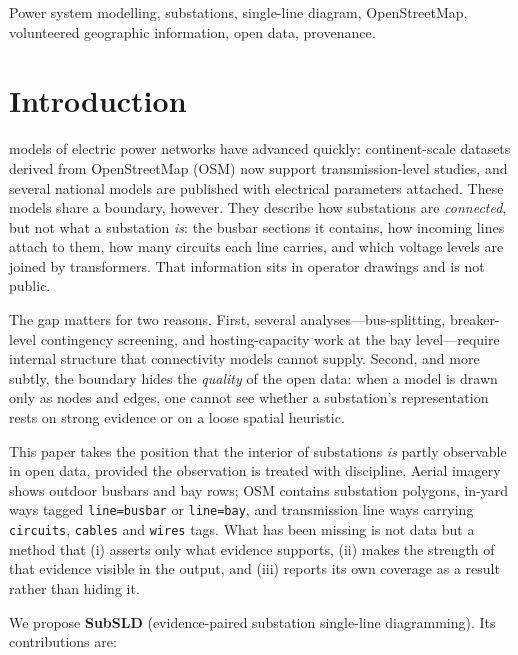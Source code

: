 \documentclass[journal]{IEEEtran}
\begin{document}
\begin{IEEEkeywords}
Power system modelling, substations, single-line diagram, OpenStreetMap,
volunteered geographic information, open data, provenance.
\end{IEEEkeywords}

\section{Introduction}

 models of electric power networks have advanced quickly:
continent-scale datasets derived from OpenStreetMap (OSM) now support
transmission-level studies, and several national models are published with
electrical parameters attached. These models share a boundary, however. They
describe how substations are \emph{connected}, but not what a substation
\emph{is}: the busbar sections it contains, how incoming lines attach to them,
how many circuits each line carries, and which voltage levels are joined by
transformers. That information sits in operator drawings and is not public.

The gap matters for two reasons. First, several analyses---bus-splitting,
breaker-level contingency screening, and hosting-capacity work at the bay
level---require internal structure that connectivity models cannot supply.
Second, and more subtly, the boundary hides the \emph{quality} of the open data:
when a model is drawn only as nodes and edges, one cannot see whether a
substation's representation rests on strong evidence or on a loose spatial
heuristic.

This paper takes the position that the interior of substations \emph{is} partly
observable in open data, provided the observation is treated with discipline.
Aerial imagery shows outdoor busbars and bay rows; OSM contains substation
polygons, in-yard ways tagged \texttt{line=busbar} or \texttt{line=bay}, and
transmission line ways carrying \texttt{circuits}, \texttt{cables} and
\texttt{wires} tags. What has been missing is not data but a method that (i)
asserts only what evidence supports, (ii) makes the strength of that evidence
visible in the output, and (iii) reports its own coverage as a result rather
than hiding it.

We propose \textbf{SubSLD} (evidence-paired substation single-line
diagramming). Its contributions are:
\end{document}
